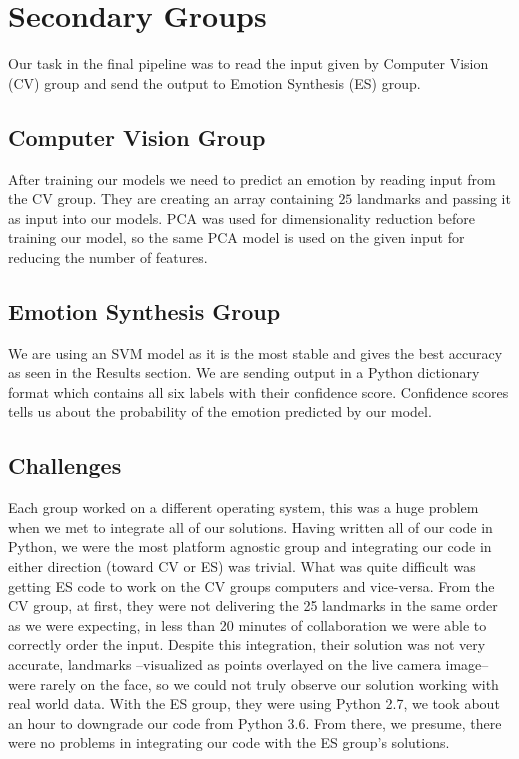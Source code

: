\section{Secondary Groups}

Our task in the final pipeline was to read the input given by Computer Vision (CV) group and send the output to Emotion Synthesis (ES) group.

\subsection{Computer Vision Group}
After training our models we need to predict an emotion by reading input from the CV group. They are creating an array containing $25$ landmarks and passing it as input into our models. PCA was used for dimensionality reduction before training our model, so the same PCA model is used on the given input for reducing the number of features.

\subsection{Emotion Synthesis Group}
We are using an SVM model as it is the most stable and gives the best accuracy as seen in the Results section. We are sending output in a Python dictionary format which contains all six labels with their confidence score. Confidence scores tells us about the probability of the emotion predicted by our model. %

\subsection{Challenges}
Each group worked on a different operating system, this was a huge problem when we met to integrate all of our solutions. Having written all of our code in Python, we were the most platform agnostic group and integrating our code in either direction (toward CV or ES) was trivial. What was quite difficult was getting ES code to work on the CV groups computers and vice-versa. From the CV group, at first, they were not delivering the 25 landmarks in the same order as we were expecting, in less than 20 minutes of collaboration we were able to correctly order the input. Despite this integration, their solution was not very accurate, landmarks --visualized as points overlayed on the live camera image-- were rarely on the face, so we could not truly observe our solution working with real world data. With the ES group, they were using Python 2.7, we took about an hour to downgrade our code from Python 3.6. From there, we presume, there were no problems in integrating our code with the ES group's solutions.
